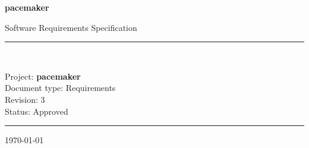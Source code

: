 \begin{titlepage}
  \centering
  \vspace*{3cm}
  {\Huge\bfseries\color{reqblue} pacemaker\par}
  \vspace{0.5cm}
  {\Large Software Requirements Specification\par}
  \vspace{1.5cm}
  \rule{\linewidth}{0.5pt}\\[0.4cm]
  {\large Project: \textbf{pacemaker}\\
         Document type: Requirements\\
         Revision: 3\\
         Status: Approved\par}
  \rule{\linewidth}{0.5pt}
  \vfill
  {\small\today}
\end{titlepage}

\tableofcontents
